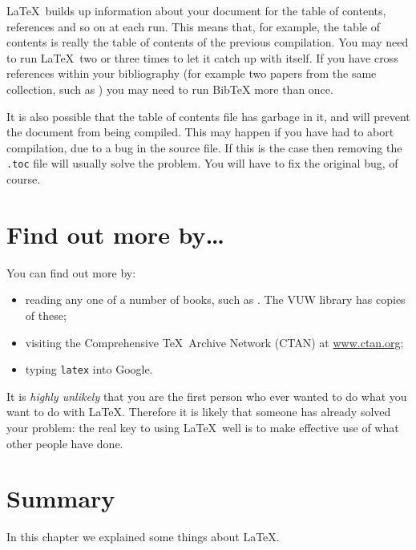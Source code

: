 \LaTeX\ builds up information about your document for the table of 
contents, references and so on at each run. This means that, for 
example, the table 
of contents is really the table of contents of the previous 
compilation. You may need to run \LaTeX\ two or three times to let it 
catch up with itself. If you have cross references within your 
bibliography (for example two papers from the same collection, such 
as \cite{Dum93a,Dum93b}) you may need to run 
BibTeX more than once. 

It is also possible that the table of contents file has garbage in 
it, and will prevent the document from being compiled. This may 
happen if you have had to abort compilation, due to a bug in the 
source file. If this is the case then removing the \texttt{.toc} file 
will usually solve the problem. You will have to fix the original 
bug, of course.


\section{Find out more by\ldots}
You can find out more by:
\begin{itemize}
\item reading any one of a number of books, such as \cite{GMS94,Lam94}. The 
VUW library has copies of these;
\item visiting  the Comprehensive \TeX\ Archive Network (CTAN) at 
\url{www.ctan.org};
\item typing \texttt{latex} into Google.
\end{itemize}

It is \emph{highly unlikely} that you are the first person who ever 
wanted to do what you want to do with \LaTeX. Therefore it is likely 
that someone has already solved your problem: the real key to using  
\LaTeX\ well is to make effective use of what other people have done.

\section{Summary}
In this chapter we explained some things about \LaTeX.
